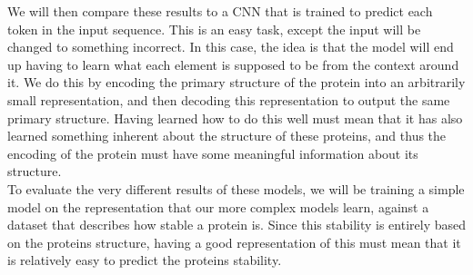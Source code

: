 \noindent
We will then compare these results to a CNN that is trained to predict each token in the input sequence. This is an easy task, except the input will be changed to something incorrect. In this case, the idea is that the model will end up having to learn what each element is supposed to be from the context around it. We do this by encoding the primary structure of the protein into an arbitrarily small representation, and then decoding this representation to output the same primary structure. Having learned how to do this well must mean that it has also learned something inherent about the structure of these proteins, and thus the encoding of the protein must have some meaningful information about its structure.\\

\noindent
To evaluate the very different results of these models, we will be training a simple model on the representation that our more complex models learn, against a dataset that describes how stable a protein is. Since this stability is entirely based on the proteins structure, having a good representation of this must mean that it is relatively easy to predict the proteins stability.